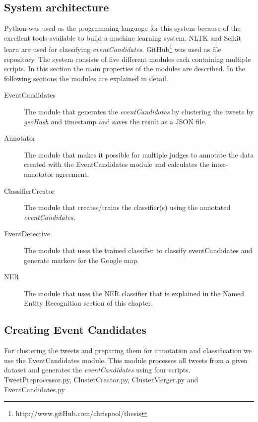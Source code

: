\documentclass[
10pt, %
a4paper, %
oneside, %
headinclude,footinclude, %
BCOR5mm, %
]{scrartcl}
\begin{document}
\subsection{System architecture}
Python was used as the programming language for this system because of the excellent tools available to build a machine learning system. NLTK and Scikit learn are used for classifying \textit{eventCandidates}. GitHub\footnote{http://www.gitHub.com/chrispool/thesis} was used as file repository. The system consists of five different modules each containing multiple scripts. In this section the main properties of the modules are described. In the following sections the modules are explained in detail.

\begin{description}

\item[EventCandidates] 
The module that generates the \textit{eventCandidates} by clustering the tweets by \textit{geoHash} and timestamp and saves the result as a JSON file.  

\item[Annotator] 
The module that makes it possible for multiple judges to annotate the data created with the EventCandidates module and calculates the inter-annotator agreement. 

\item[ClassifierCreator] 
The module that creates/trains the classifier(s) using the annotated \textit{eventCandidates.}

\item[EventDetective] 
The module that uses the trained classifier to classify eventCandidates and generate markers for the Google map.

\item[NER]
The module that uses the NER classifier that is explained in the Named Entity Recognition section of this chapter.  

\end{description}

\newpage


\subsection{Creating Event Candidates}
For clustering the tweets and preparing them for annotation and classification we use the EventCandidates module. This module processes all tweets from a given dataset and generates the \textit{eventCandidates} using four scripts. TweetPreprocessor.py, ClusterCreator.py, ClusterMerger.py and EventCandidates.py
\end{document}
